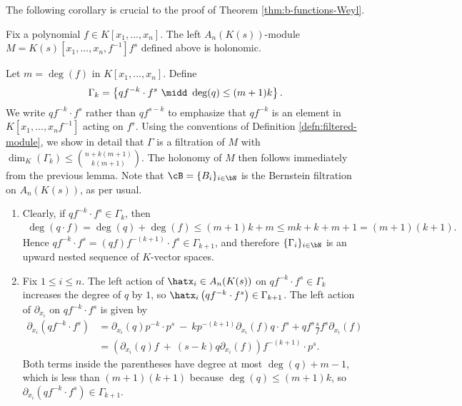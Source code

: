 The following corollary is crucial to the proof of Theorem \ref{thm:b-functions-Weyl}.
\begin{cor}\label{cor:holonomic-for-b-functions}
	Fix a polynomial $f \in K[x_1,...,x_n]$. The left $A_n(K(s))$-module $M = K(s)[x_1,...,x_n,f^{-1}]f^s$ defined above is holonomic.
\end{cor}
\begin{prf}
	Let $m = \deg(f)$ in $K[x_1,...,x_n]$. Define
	\begin{align*}
		\Gamma_k = \left\{qf^{-k}\cdot f^s ~\midd~ \deg(q) \leq (m+1)k\right\}.
	\end{align*}
	We write $qf^{-k}\cdot f^s$ rather than $qf^{s-k}$ to emphasize that $qf^{-k}$ is an element in $K[x_1,...,x_nf^{-1}]$ acting on $f^s$. Using the conventions of Definition \ref{defn:filtered-module}, we show in detail that $\Gamma$ is a filtration of $M$ with $\dim_K(\Gamma_k)\leq \binom{n + k(m+1)}{k(m+1)}.$ The holonomy of $M$ then follows immediately from the previous lemma. Note that $\cB = \{B_i\}_{i\in \bN}$ is the Bernstein filtration on $A_n(K(s))$, as per usual.
	\begin{enumerate}[(1)]
		\item Clearly, if $qf^{-k}\cdot f^s \in \Gamma_k$, then
			\begin{align*}
				\deg(q\cdot f) = \deg(q) + \deg(f) \leq (m+1)k + m \leq mk + k + m + 1 = (m+1)(k+1).
			\end{align*}
			Hence $qf^{-k}\cdot f^s = (qf)f^{-(k+1)}\cdot f^s \in \Gamma_{k+1}$, and therefore $\{\Gamma_i\}_{i\in \bN}$ is an upward nested sequence of $K$-vector spaces.
		\item Fix $1\leq i\leq n$. The left action of $\hatx_i \in A_n(K(s))$ on $qf^{-k}\cdot f^s \in \Gamma_k$ increases the degree of $q$ by $1$, so $\hatx_i\left(qf^{-k}\cdot f^s\right) \in \Gamma_{k+1}$. The left action of $\partial_{x_i}$ on $qf^{-k}\cdot f^s$ is given by
			\begin{align*}
				\partial_{x_i}(qf^{-k}\cdot f^s)
				  &= \partial_{x_i}(q)p^{-k}\cdot p^s ~-~ kp^{-(k+1)}\partial_{x_i}(f)q\cdot f^s + qf^s\frac{s}{f} f^s\partial_{x_i}(f) \\
				  &= \left(\partial_{x_i}(q)f ~+~ (s-k)q\partial_{x_i}(f)\right)f^{-(k+1)}\cdot p^s.
			\end{align*}
			Both terms inside the parentheses have degree at most $\deg(q) + m -1$, which is less than $(m+1)(k+1)$ because $\deg(q) \leq (m+1)k$, so $\partial_{x_i}(qf^{-k}\cdot f^s) \in \Gamma_{k+1}$.


\end{enumerate}
\end{prf}
